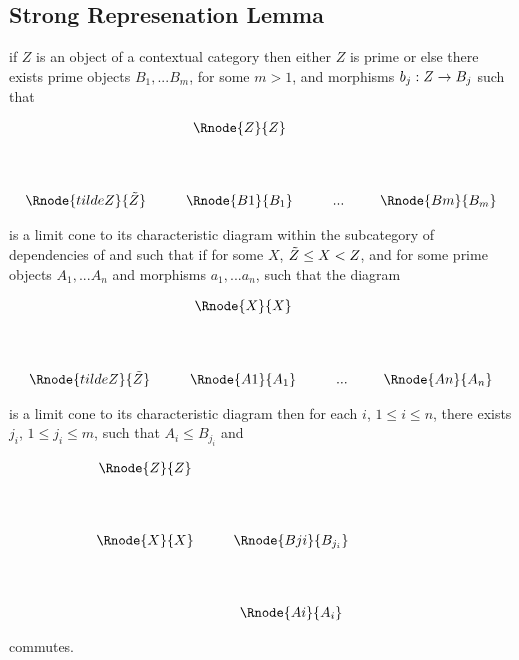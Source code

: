 \documentclass[10pt,a4paper]{scrartcl}
\begin{document}
\subsection{Strong Represenation Lemma}
\begin{lemma}
if $Z$ is an object of a contextual category \ccat then either $Z$ is prime or else 
there exists prime objects $B_1,...B_m$, for some $m > 1$, and morphisms $b_j : Z \rightarrow B_j$ such that

\begin{center}
\begin{displaymath}
\begin{array}{cp{0.3cm}c         p{0.3cm}  c p{0.2cm} c}
               & & \Rnode{Z}{Z} & &     & &  \\ [1.4cm]
\Rnode{tildeZ}{\pbase{Z}}& &\Rnode{B1}{B_1}& & ... & &\Rnode{Bm}{B_m}
\end{array}
\end{displaymath}
\end{center}
\noindent
is a limit cone to its characteristic diagram within the subcategory of dependencies of \ccat and such that if for some $X$,
 $\tilde{Z} \leq X < Z$, and for some prime objects $A_1,...A_n$ and morphisms $a_1,...a_n$, such that the diagram
\begin{center}
\begin{displaymath}
\begin{array}{cp{0.3cm}c         p{0.3cm}  c p{0.2cm} c}
               & & \Rnode{X}{X} & &     & &  \\ [1.4cm]
\Rnode{tildeZ}{\pbase{Z}}& &\Rnode{A1}{A_1}& & ... & &\Rnode{An}{A_n}
\end{array}
\end{displaymath}
\end{center}
is a limit cone to its characteristic diagram then for each $i$, $1 \leq i \leq n$, there exists $j_i$, $1 \leq j_i \leq m$, such that
$A_i \leq B_{j_i}$ and
\begin{center}
\begin{displaymath}
\begin{array}{cp{0.3cm}c         p{0.3cm}  c p{0.2cm} c}
\Rnode{Z}{Z} & &     & & & &  \\ [1.4cm]
\Rnode{X}{X}& &\Rnode{Bji}{B_{j_i}}& &    & & \\[1.4cm]
            & &\Rnode{Ai}{A_i}     & &    & &
\end{array}
\end{displaymath}
\end{center}

commutes.
\end{lemma}
\end{document}

